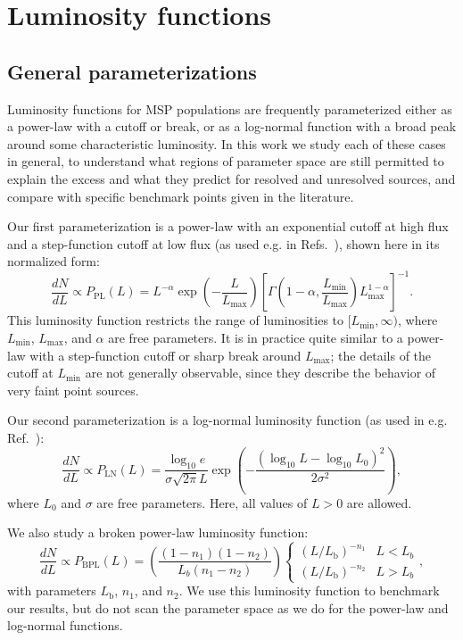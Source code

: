 \documentclass[letter,11pt]{article}
\newcommand{\parens}[1]{\left(#1\right)}
\newcommand{\brackets}[1]{\left[#1\right]}
\newcommand{\expp}[1]{\exp \parens{#1}}
\newcommand{\fraci}[2]{#1 / #2}
\begin{document}
\section{Luminosity functions}
\label{sec:lum-funcs}

\subsection{General parameterizations}

Luminosity functions for MSP populations are frequently parameterized either as a power-law with a cutoff or break, or as a log-normal function with a broad peak around some characteristic luminosity. In this work we study each of these cases in general, to understand what regions of parameter space are still permitted to explain the excess and what they predict for resolved and unresolved sources, and compare with specific benchmark points given in the literature.

Our first parameterization is a power-law with an exponential cutoff at high flux and a step-function cutoff at low flux (as used e.g. in Refs.~\cite{Zhong:2019ycb, Bartels:2018xom}), shown here in its normalized form:
\begin{equation}
    \frac{dN}{dL} \propto P_\text{PL}(L) = L^{-\alpha} \expp{-\frac{L}{L_\text{max}}}\brackets{\Gamma\parens{1-\alpha, \frac{L_\text{min}}{L_\text{max}}}L_\text{max}^{1-\alpha}}^{-1}.
    \label{eqn:power-law}
\end{equation}
This luminosity function restricts the range of luminosities to $[L_\text{min}, \infty)$, where $L_\text{min}$, $L_\text{max}$, and $\alpha$ are free parameters. It is in practice quite similar to a power-law with a step-function cutoff or sharp break around $L_\text{max}$; the details of the cutoff at $L_\text{min}$ are not generally observable, since they describe the behavior of very faint point sources.

Our second parameterization is a log-normal luminosity function (as used in e.g. Ref.~\cite{Hooper16}):
\begin{equation}
    \frac{dN}{dL} \propto P_\text{LN}(L)= \frac{\log_{10} e}{\sigma \sqrt{2\pi} L}\expp{-\frac{\parens{\log_{10} L - \log_{10} L_0}^2}{2\sigma^2}},
    \label{eqn:log-normal}
\end{equation}
where $L_0$ and $\sigma$ are free parameters. Here, all values of $L>0$ are allowed.

We also study a broken power-law luminosity function:
\begin{equation}
    \frac{dN}{dL} \propto P_\text{BPL}(L) = \parens{\frac{\parens{1-n_1}\parens{1-n_2}}{L_b \parens{n_1 - n_2}}}\begin{cases}
        \parens{\fraci{L}{L_\text{b}}}^{-n_{1}} & L < L_{b} \\
        \parens{\fraci{L}{L_\text{b}}}^{-n_{2}} & L > L_b
    \end{cases},
    \label{eqn:nptf}
\end{equation}
with parameters $L_\text{b}$, $n_1$, and $n_2$. We use this luminosity function to benchmark our results, but do not scan the parameter space as we do for the power-law and log-normal functions.
\end{document}
